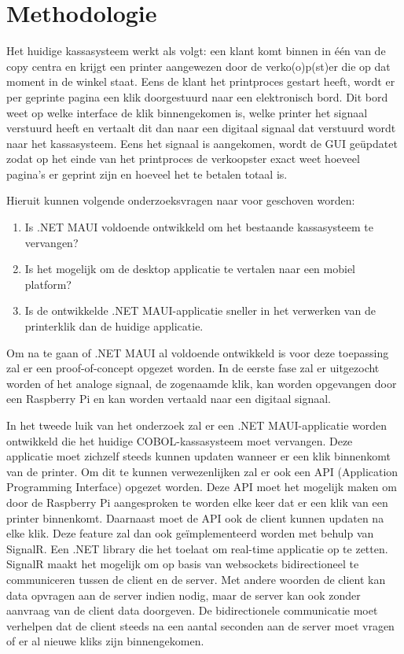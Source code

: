 \section{Methodologie}%
\label{sec:methodologie}
Het huidige kassasysteem werkt als volgt: een klant komt binnen in één van de copy centra en krijgt een printer aangewezen door de verko(o)p(st)er die op dat moment in de winkel staat. Eens de klant het printproces gestart heeft, wordt er per geprinte pagina een klik doorgestuurd naar een elektronisch bord. Dit bord weet op welke interface de klik binnengekomen is, welke printer het signaal verstuurd heeft en vertaalt dit dan naar een digitaal signaal dat verstuurd wordt naar het kassasysteem. Eens het signaal is aangekomen, wordt de GUI geüpdatet zodat op het einde van het printproces de verkoopster exact weet hoeveel pagina’s er geprint zijn en hoeveel het te betalen totaal is.

Hieruit kunnen volgende onderzoeksvragen naar voor geschoven worden:
\begin{enumerate}
    \item Is .NET MAUI voldoende ontwikkeld om het bestaande kassasysteem te vervangen?
    \item  Is het mogelijk om de desktop applicatie te vertalen naar een mobiel platform?
    \item Is de ontwikkelde .NET MAUI-applicatie sneller in het verwerken van de printerklik dan de huidige applicatie. 
\end{enumerate}
Om na te gaan of .NET MAUI al voldoende ontwikkeld is voor deze toepassing zal er een proof-of-concept opgezet worden. In de eerste fase zal er uitgezocht worden of het analoge signaal, de zogenaamde klik, kan worden opgevangen door een Raspberry Pi en kan worden vertaald naar een digitaal signaal.

In het tweede luik van het onderzoek zal er een .NET MAUI-applicatie worden ontwikkeld die het huidige COBOL-kassasysteem moet vervangen. Deze applicatie moet zichzelf steeds kunnen updaten wanneer er een klik binnenkomt van de printer. Om dit te kunnen verwezenlijken zal er ook een API (Application Programming Interface) opgezet worden. Deze API moet het mogelijk maken om door de Raspberry Pi aangesproken te worden elke keer dat er een klik van een printer binnenkomt. Daarnaast moet de API ook de client kunnen updaten na elke klik. Deze feature zal dan ook geïmplementeerd worden met behulp van SignalR. Een .NET library die het toelaat om real-time applicatie op te zetten. SignalR maakt het mogelijk om op basis van websockets bidirectioneel te communiceren tussen de client en de server. Met andere woorden de client kan data opvragen aan de server indien nodig, maar de server kan ook zonder aanvraag van de client data doorgeven. De bidirectionele communicatie moet verhelpen dat de client steeds na een aantal seconden aan de server moet vragen of er al nieuwe kliks zijn binnengekomen.

